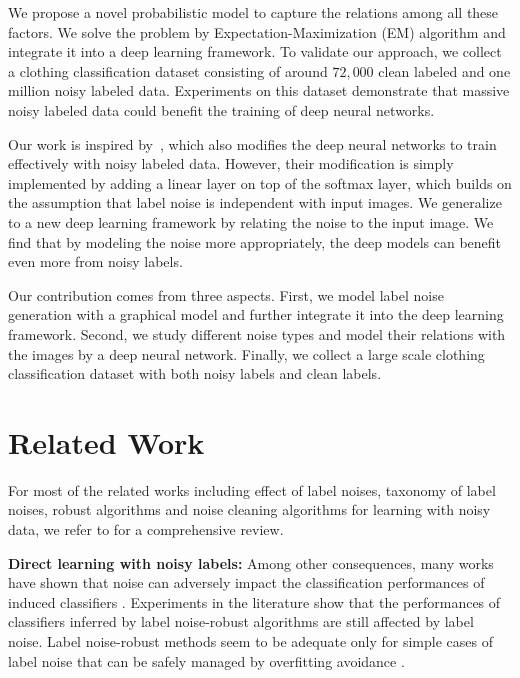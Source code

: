 \documentclass[10pt,twocolumn,letterpaper]{article}
\begin{document}
We propose a novel probabilistic model to capture the relations among all these factors. We solve the problem by Expectation-Maximization (EM) algorithm and integrate it into a deep learning framework. To validate our approach, we collect a clothing classification dataset consisting of around $72,000$ clean labeled and one million noisy labeled data. Experiments on this dataset demonstrate that massive noisy labeled data could benefit the training of deep neural networks.

Our work is inspired by~\cite{sukhbaatar2014learning}, which also modifies the deep neural networks to train effectively with noisy labeled data. However, their modification is simply implemented by adding a linear layer on top of the softmax layer, which builds on the assumption that label noise is independent with input images. We generalize~\cite{sukhbaatar2014learning} to a new deep learning framework by relating the noise to the input image. We find that by modeling the noise more appropriately, the deep models can benefit even more from noisy labels.

Our contribution comes from three aspects. First, we model label noise generation with a graphical model and further integrate it into the deep learning framework. Second, we study different noise types and model their relations with the images by a deep neural network. Finally, we collect a large scale clothing classification dataset with both noisy labels and clean labels. 


\section{Related Work} %
\label{sec:related_work}
For most of the related works including effect of label noises, taxonomy of label noises, robust algorithms and noise cleaning algorithms for learning with noisy data, we refer to \cite{frenay2013classification} for a comprehensive review. 

{\bf Direct learning with noisy labels:} Among other consequences, many works have shown that noise can adversely impact the classification performances of induced classifiers \cite{zhu2004class}. 
Experiments in the literature show that the performances of classifiers inferred by label noise-robust algorithms are still affected by label noise. Label noise-robust methods seem to be adequate only for simple cases of label noise that can be safely managed by overfitting avoidance \cite{frenay2013classification}.
\end{document}
